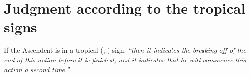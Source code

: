 \section{Judgment according to the tropical signs}
If the Ascendent is in a tropical (\Cancer, \Capricorn) sign, \textsl{``then it indicates the breaking off of the end of this action before it is finished, and it indicates that he will commence this action a second time.''}
